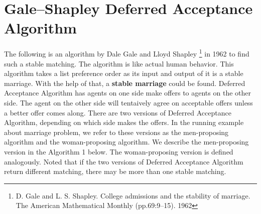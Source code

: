 \begin{center}
    \begin{minipage}{.3\textwidth}
    \end{minipage}
    \begin{minipage}{.3\textwidth}
    \end{minipage}
\end{center}

\clearpage
\section{Gale–Shapley Deferred Acceptance Algorithm}
    The following is an algorithm by Dale Gale and Lloyd Shapley \footnote{D. Gale and L. S. Shapley. College admissions and the stability of marriage. The American Mathematical Monthly (pp.69:9–15). 1962} in 1962 to find such a stable matching. The algorithm is like actual human behavior.
    This algorithm takes a list preference order as its input and output of it is a stable marriage. With the help of that, a \textbf{stable marriage} could be found.
    Deferred Acceptance Algorithm has agents on one side make offers to agents on the other side. The agent on the other side will tentaively agree on acceptable offers unless a better offer comes along. 
    There are two versions of Deferred Acceptance Algorithm, depending on which side makes the offers.	In the running example about marriage problem, we refer to these versions as the men-proposing algorithm and the woman-proposing algorithm.   
	We describe the men-proposing version in the Algorithm 1 below. The woman-proposing version is defined analogously. Noted that if the two versions of Deferred Acceptance Algorithm return different matching, there may be more than one stable matching.
    \\ 

